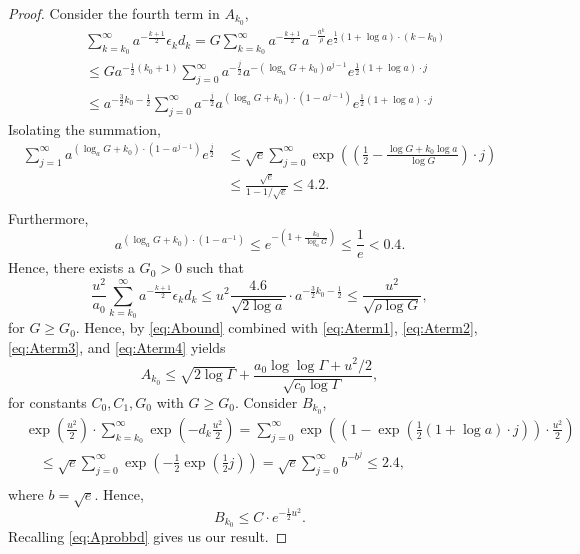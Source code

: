 \begin{proof}
Consider the fourth term in $A_{k_0}$,
\begin{align*}
    &\sum_{k=k_0}^\infty a^{-\frac{k+1}{2}} \epsilon_k d_k = G \sum_{k=k_0}^\infty a^{-\frac{k+1}{2}} a^{-\frac{a^k}{\rho}} e^{\frac 12 (1 + \log a) \cdot (k-k_0)} \\ 
    & \le G a^{-\frac 12 (k_0 + 1)} \sum_{j=0}^\infty a^{-\frac{j}{2}} a^{-(\log_a G + k_0) a^{j-1}} e^{\frac 12 (1 + \log a) \cdot j} \\
    & \le a^{- \frac 32 k_0 - \frac 12} \sum_{j=0}^\infty a^{-\frac{j}{2}} a^{(\log_a G + k_0) \cdot (1 - a^{j-1})} e^{\frac 12 (1 + \log a) \cdot j}
\end{align*}
Isolating the summation,
\begin{align*}
    \sum_{j=1}^\infty a^{(\log_a G + k_0) \cdot (1 - a^{j-1})} e^{\frac j2} &\le \sqrt e \sum_{j=0}^\infty \exp\left( \left( \frac 12 - \frac{\log G + k_0 \log a}{\log G} \right) \cdot j \right)\\
    & \le \frac{\sqrt e}{1 - 1/\sqrt e} \le 4.2. \\
\end{align*}
Furthermore,
\begin{equation*}
    a^{(\log_a G + k_0) \cdot (1 - a^{-1})} \le e^{-\left( 1 + \frac{k_0}{\log_a G} \right) } \le \frac 1e < 0.4.
\end{equation*}
Hence, there exists a $G_0 > 0$ such that 
\begin{equation}
\label{eq:Aterm4}
    \frac{u^2}{a_0} \sum_{k=k_0}^\infty a^{-\frac{k+1}{2}} \epsilon_k d_k \le u^2 \frac{4.6}{\sqrt{2 \log a}} \cdot a^{-\frac 32 k_0 - \frac 12} \le \frac{u^2}{\sqrt{\rho \log G}},
\end{equation}
for $G \ge G_0$.
Hence, by \eqref{eq:Abound} combined with \eqref{eq:Aterm1}, \eqref{eq:Aterm2}, \eqref{eq:Aterm3}, and \eqref{eq:Aterm4} yields
\begin{equation*}
    A_{k_0} \le \sqrt{2 \log \Gamma} + \frac{a_0 \log \log \Gamma + u^2/2}{\sqrt{c_0 \log \Gamma}},
\end{equation*}
for constants $C_0, C_1, G_0$ with $G \ge G_0$.
Consider $B_{k_0}$,
\begin{align}
    &\exp \left( \frac{u^2}{2} \right) \cdot \sum_{k=k_0}^\infty \exp \left( - d_k \frac{u^2}{2} \right) = \sum_{j=0}^\infty \exp \left( \left(1 - \exp \left( \frac 12 (1 + \log a)\cdot j \right) \right) \cdot \frac{u^2}{2} \right) \\
    &\quad \le \sqrt e \sum_{j=0}^\infty \exp \left( - \frac 12 \exp\left( \frac 12 j \right) \right) = \sqrt e \sum_{j=0}^\infty b^{-b^j} \le 2.4, \\
\end{align}
where $b = \sqrt e$.
Hence,
\begin{equation*}
    B_{k_0} \le C \cdot e^{-\frac 12 u^2}.
\end{equation*}
Recalling \eqref{eq:Aprobbd} gives us our result.
\end{proof}


